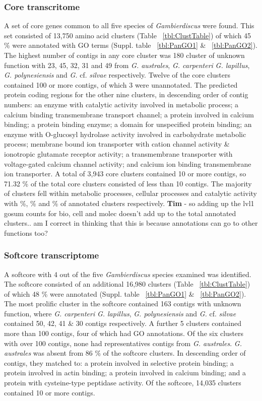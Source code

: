 \documentclass[12pt]{article}
\begin{document}
\subsubsection*{Core transcritome}
A set of core genes common to all five species of \textit{Gambierdiscus} were found. 
This set consisted of 13,750 amino acid clusters (Table ~\ref{tbl:ClustTable}) of which 45 \% were annotated with GO terms (Suppl. table ~\ref{tbl:PanGO1} \& ~\ref{tbl:PanGO2}). 
The highest number of contigs in any core cluster was 180 cluster of unknown function with 23, 45, 32, 31 and 49 from \textit{G. australes}, \textit{G. carpenteri} \textit{G. lapillus}, \textit{G. polynesiensis} and \textit{G.} cf. \textit{silvae} respectively. 
Twelve of the core clusters contained 100 or more contigs, of which 3 were unannotated. 
The predicted protein coding regions for the other nine clusters, in descending order of contig numbers: an enzyme with catalytic activity involved in metabolic process; a calcium binding transmembrane transport channel; a protein involved in calcium binding; a protein binding enzyme; a domain for unspecified protein binding; an enzyme with O-glucosyl hydrolase activity involved in carbohydrate metabolic process; membrane bound ion transporter with cation channel activity \& ionotropic glutamate receptor activity; a transmembrane transporter with voltage-gated calcium channel activity; and calcium ion binding transmembrane ion transporter. 
A total of 3,943 core clusters contained 10 or more contigs, so 71.32 \% of the total core clusters consisted of less than 10 contigs. 
The majority of  clusters fell within metabolic processes, cellular processes and catalytic activity with \%, \% and \% of annotated clusters respectively. \textbf{Tim} - so adding up the lvl1 gosum counts for bio, cell and molec doesn't add up to the total annotated clusters.. am I correct in thinking that this is because annotations can go to other functions too?

\subsubsection*{Softcore transcriptome}
A softcore with 4 out of the five \textit{Gambierdiscus} species examined was identified. 
The softcore consisted of an additional 16,980 clusters (Table ~\ref{tbl:ClustTable}) of which 48 \% were annotated  (Suppl. table ~\ref{tbl:PanGO1} \& ~\ref{tbl:PanGO2}). 
The most prolific cluster in the softcore contained 163 contigs with unknown function, where \textit{G. carpenteri} \textit{G. lapillus}, \textit{G. polynesiensis} and \textit{G.} cf. \textit{silvae} contained 50, 42, 41 \& 30 contigs respectively. 
A further 5 clusters contained more than 100 contigs, four of which had GO annotations. 
Of the six clusters with over 100 contigs, none had representatives contigs from \textit{G. australes}. 
\textit{G. australes} was absent from 86 \% of the softcore clusters. 
In descending order of contigs, they matched to: a protein involved in selective protein binding; a protein involved in actin binding; a protein involved in calcium binding; and a protein with cysteine-type peptidase activity. 
Of the softcore, 14,035 clusters contained 10 or more contigs. 
\end{document}
